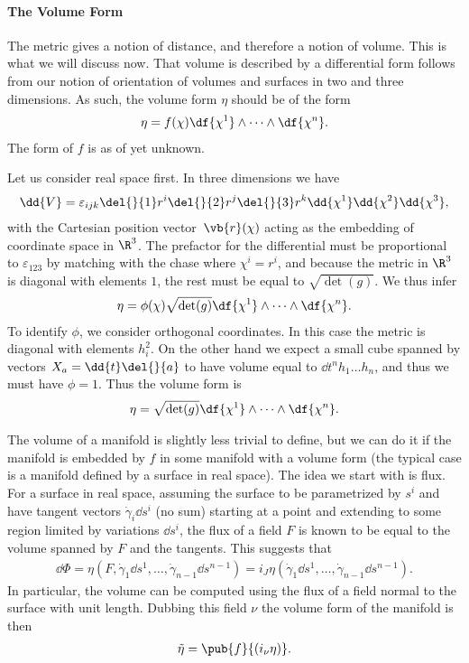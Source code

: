 \paragraph{The Volume Form}
The metric gives a notion of distance, and therefore a notion of volume. This is what we will discuss now. That volume is described by a differential form follows from our notion of orientation of volumes and surfaces in two and three dimensions. As such, the volume form $\eta$ should be of the form
\begin{align*}
	\eta = f(\chi)\df{\chi^{1}}\wedge\dots\wedge\df{\chi^{n}}.
\end{align*}
The form of $f$ is as of yet unknown.

Let us consider real space first. In three dimensions we have
\begin{align*}
	\dd{V} = \varepsilon_{ijk}\del{}{1}r^{i}\del{}{2}r^{j}\del{}{3}r^{k}\dd{\chi^{1}}\dd{\chi^{2}}\dd{\chi^{3}},
\end{align*}
with the Cartesian position vector $\vb{r}(\chi)$ acting as the embedding of coordinate space in $\R^{3}$. The prefactor for the differential must be proportional to $\varepsilon_{123}$ by matching with the chase where $\chi^{i} = r^{i}$, and because the metric in $\R^{3}$ is diagonal with elements $1$, the rest must be equal to $\sqrt{\det(g)}$. We thus infer
\begin{align*}
	\eta = \phi(\chi)\sqrt{\det(g)}\df{\chi^{1}}\wedge\dots\wedge\df{\chi^{n}}.
\end{align*}
To identify $\phi$, we consider orthogonal coordinates. In this case the metric is diagonal with elements $h_{i}^{2}$. On the other hand we expect a small cube spanned by vectors $X_{a} = \dd{t}\del{}{a}$ to have volume equal to $\dd{t}^{n}h_{1}\dots h_{n}$, and thus we must have $\phi = 1$. Thus the volume form is
\begin{align*}
	\eta = \sqrt{\det(g)}\df{\chi^{1}}\wedge\dots\wedge\df{\chi^{n}}.
\end{align*}

The volume of a manifold is slightly less trivial to define, but we can do it if the manifold is embedded by $f$ in some manifold with a volume form (the typical case is a manifold defined by a surface in real space). The idea we start with is flux. For a surface in real space, assuming the surface to be parametrized by $s^{i}$ and have tangent vectors $\dot{\gamma}_{i}\dd{s^{i}}$ (no sum) starting at a point and extending to some region limited by variations $\dd{s^{i}}$, the flux of a field $F$ is known to be equal to the volume spanned by $F$ and the tangents. This suggests that
\begin{align*}
	\dd{\Phi} = \eta(F, \dot{\gamma}_{1}\dd{s^{1}}, \dots, \dot{\gamma}_{n - 1}\dd{s^{n - 1}}) = i_{J}\eta(\dot{\gamma}_{1}\dd{s^{1}}, \dots, \dot{\gamma}_{n - 1}\dd{s^{n - 1}}).
\end{align*}
In particular, the volume can be computed using the flux of a field normal to the surface with unit length. Dubbing this field $\nu$ the volume form of the manifold is then
\begin{align*}
	\tilde{\eta} = \pub{f}{(i_{\nu}\eta)}.
\end{align*}


